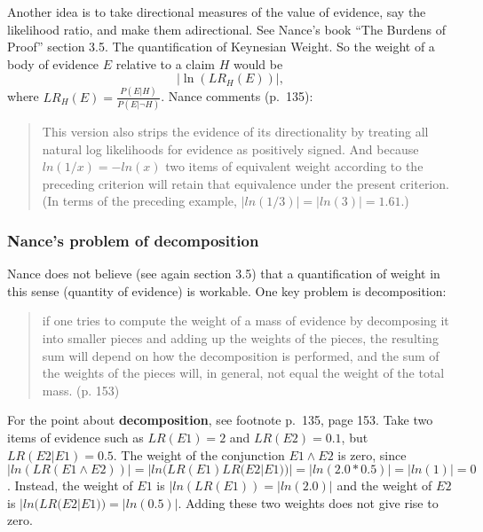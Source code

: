 \documentclass[
  10pt,
  dvipsnames,enabledeprecatedfontcommands]{scrartcl}
\begin{document}
Another idea is to take directional measures of the value of evidence,
say the likelihood ratio, and make them adirectional. See Nance's book
``The Burdens of Proof'' section 3.5. The quantification of Keynesian
Weight. So the weight of a body of evidence \(E\) relative to a claim
\(H\) would be \[\vert \ln (LR_H(E)) \vert, \] where
\(LR_H(E)=\frac{P(E \vert H)}{P(E \vert \neg H)}\). Nance comments
(p.~135):

\begin{quote}
This version also strips the evidence of its directionality by treating all natural log likelihoods for evidence as positively signed. And because 
$ln(1/x) = -ln(x)$
two items of equivalent weight according to the preceding criterion will retain that equivalence under the present criterion. (In terms of the preceding example, 
$|ln(1/3)|= |ln(3)| = 1.61.$)
\end{quote}

\hypertarget{nances-problem-of-decomposition}{%
\subsubsection{Nance's problem of
decomposition}\label{nances-problem-of-decomposition}}

Nance does not believe (see again section 3.5) that a quantification of
weight in this sense (quantity of evidence) is workable. One key problem
is decomposition:

\begin{quote}
 if one tries to compute the weight of a mass of evidence by decomposing it into smaller pieces and adding up the weights of the pieces, the resulting sum will depend on how the decomposition is performed, and the sum of the weights of the pieces will, in general, not equal the weight of the total mass. (p. 153)
\end{quote}


For the point about \textbf{decomposition}, see footnote p.~135, page
153. Take two items of evidence such as \(LR(E1)=2\) and \(LR(E2)=0.1\),
but \(LR(E2 | E1)=0.5\). The weight of the conjunction \(E1 \wedge E2\)
is zero, since
\(|ln(LR(E1 \wedge E2))|=|ln(LR(E1)LR(E2| E1))|=|ln(2.0*0.5)|=|ln(1)|=0\).
Instead, the weight of \(E1\) is \(|ln(LR(E1))=|ln(2.0)|\) and the
weight of \(E2\) is \(|ln(LR(E2|E1))=|ln(0.5)|\). Adding these two
weights does not give rise to zero.
\end{document}
